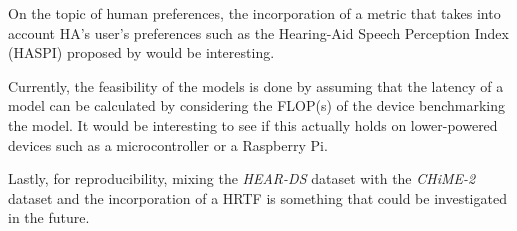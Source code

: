 \documentclass[logo,bsc,singlespacing,parskip,online]{infthesis}
\newcommand{\heards}{\textit{HEAR-DS}\xspace}
\newcommand{\chime}[1]{\textit{CHiME-#1}\xspace}
\begin{document}
On the topic of human preferences, 
the incorporation of a metric 
that takes into account HA's user's preferences
such as the Hearing-Aid Speech Perception Index (HASPI)
proposed by \citet{Kates2021HASPI} would be interesting.

Currently, the feasibility of the models is done by 
assuming that the latency of a model can be 
calculated by considering the FLOP(s) of the device 
benchmarking the model. It would be interesting to see 
if this actually holds on lower-powered devices 
such as a microcontroller or a Raspberry Pi.

Lastly, for reproducibility, mixing the \heards dataset 
with the \chime{2} dataset and the incorporation of 
a HRTF is something that could be investigated in the future.













\end{document}
